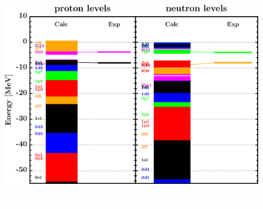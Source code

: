 \documentclass[twocolumn,secnumarabic,amssymb, nobibnotes, aps, prl,
superscriptaddress, nobalancelastpage]{revtex4}
\begin{document}
\begin{figure}[!htb]
\begin{minipage}{0.4\linewidth}
        \label{DOM_pb208_chargeDensity}
    \end{minipage}
    \begin{minipage}{0.35\linewidth}
        \centering
        \includegraphics[width=\linewidth]{figures/pb208_SPLevels.png}
        \label{DOM_pb208_SPLevels}
    \end{minipage}
    \begin{minipage}{0.4\linewidth}
        \centering
        \includegraphics[width=\linewidth]{figures/pb208_RMSRadius.png}

\end{minipage}
\end{figure}
\end{document}
